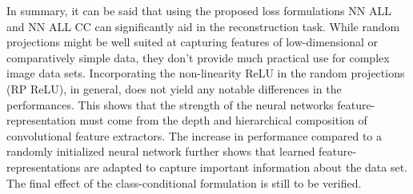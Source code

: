 In summary, it can be said that using the proposed loss formulations 
NN ALL and NN ALL CC can significantly 
aid in the reconstruction task.
While random projections might be 
well suited at capturing features 
of low-dimensional or comparatively simple data, 
they don't provide much practical use for complex image data sets.
Incorporating the non-linearity ReLU in the random projections (RP ReLU), in general, 
does not yield any notable differences in the performances.
This shows that the strength of the neural networks feature-representation
must come from the depth and hierarchical composition of convolutional feature extractors.
The increase in performance compared to a randomly initialized neural network
further shows that learned feature-representations are adapted to capture
important information about the data set.
The final effect of the class-conditional formulation is still to be verified.













